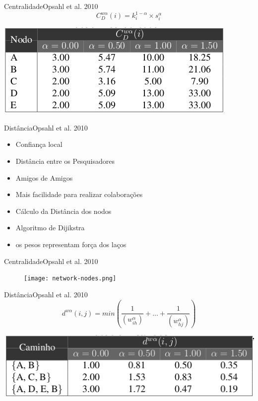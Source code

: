 \documentclass{beamer}
\begin{document}
\begin{frame}{Centralidade}{Opsahl et al. 2010}
  \begin{equation} \label{eqn:centrality} 
    C_D ^{w \alpha} (i) = k_i ^{1 - \alpha} \times s _i ^{\alpha}
  \end{equation}
  \begin{table}[ht]
    \label{tab:centrality}
    \includegraphics[width=.8\textwidth]{centrality.png}
  \end{table}
\end{frame}

\begin{frame}{Distância}{Opsahl et al. 2010}
  \begin{itemize}
    \item Confiança local 
    \item Distância entre os Pesquisadores
    \item Amigos de Amigos
    \item Mais facilidade para realizar colaborações
    \item Cálculo da Distância dos nodos
    \item Algoritmo de Dijikstra
    \item os pesos representam força dos laços
  \end{itemize}
\end{frame}

\begin{frame}{Centralidade}{Opsahl et al. 2010}
  \begin{figure}[ht]
    \texttt{[image: network-nodes.png]}
    \label{fig:sr-arch}
  \end{figure}
\end{frame}

\begin{frame}{Distância}{Opsahl et al. 2010}
  \begin{equation} \label{eqn:distance}
    d^{w\alpha}(i, j) = min \left( \frac{1}{ \left( w_{ih}^{\alpha} \right) } + \dots + \frac{1}{ \left( w_{hj}^{\alpha} \right) }  \right) 
  \end{equation}
  \begin{table}[ht]
    \label{tab:distances}
    \includegraphics[width=.85\textwidth]{distances.png}
  \end{table}
\end{frame}
\end{document}

